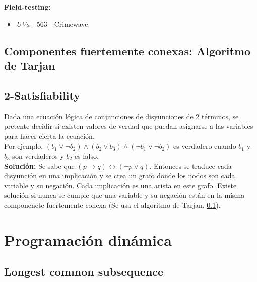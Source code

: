 \documentclass[10pt,letterpaper,twocolumn,twosided]{article}
\newcommand{\codigofuente}[1]{

\dotfill
}
\begin{document}
\small
\textbf{Field-testing:}
\begin{itemize}
\item \emph{UVa} - 563 - Crimewave
\end{itemize}
\normalsize

\codigofuente{./src/grafos/ford_fulkerson_sparse.cpp}

\subsection{Componentes fuertemente conexas: Algoritmo de Tarjan}
\label{tarjan}
\codigofuente{./src/grafos/tarjan.cpp}

\subsection{2-Satisfiability}
Dada una ecuación lógica de conjunciones de disyunciones de 2 términos, se pretente decidir si existen valores de verdad que puedan asignarse a las variables para hacer cierta la ecuación. \\
Por ejemplo, $(b_1 \vee \neg b_2) \wedge (b_2 \vee b_3) \wedge (\neg b_1 \vee \neg b_2) $ es verdadero cuando $b_1$ y $b_3$ son verdaderos y $b_2$ es falso. \\
\textbf{Solución:} Se sabe que $(p \rightarrow q) \leftrightarrow (\neg p \vee q)$. Entonces se traduce cada disyunción en una implicación y se crea un grafo donde los nodos son cada variable y su negación. Cada implicación es una arista en este grafo. Existe solución si nunca se cumple que una variable y su negación están en la misma componenete fuertemente conexa (Se usa el algoritmo de Tarjan, \ref{tarjan}).

\section{Programación dinámica}
\subsection{Longest common subsequence}
\codigofuente{./src/dp/lcs.cpp}
\end{document}
